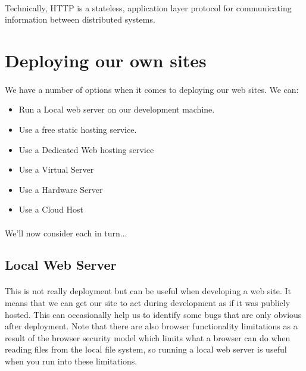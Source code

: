 \paragraph{} Technically, HTTP is a stateless, application layer protocol for communicating information between distributed systems.


\section{Deploying our own sites}

\paragraph{} We have a number of options when it comes to deploying our web sites. We can:

\begin{itemize}
\item Run a Local web server on our development machine. 
\item Use a free static hosting service. 
\item Use a Dedicated Web hosting service
\item Use a Virtual Server
\item Use a Hardware Server
\item Use a Cloud Host
\end{itemize}

\paragraph{} We'll now consider each in turn...

\subsection{Local Web Server}
\paragraph{} This is not really deployment but can be useful when developing a web site. It means that we can get our site to act during development as if it was publicly hosted. This can occasionally help us to identify some bugs that are only obvious after deployment. Note that there are also browser functionality limitations as a result of the browser security model which limits what a browser can do when reading files from the local file system, so running a local web server is useful when you run into these limitations.
